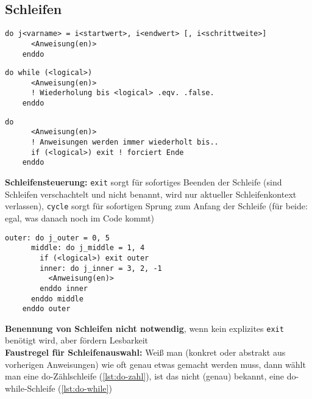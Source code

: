 \documentclass[a4paper, twocolumn]{scrarticle}
\begin{document}
  \subsection{Schleifen}
  \begin{lstlisting}[caption={\bfseries do-Zählschleife (Schrittweite standardmäßig 1, kann auch negativ sein)}, label=lst:do-zahl]
    do j<varname> = i<startwert>, i<endwert> [, i<schrittweite>]
      <Anweisung(en)>
    enddo
  \end{lstlisting}
  \begin{lstlisting}[caption={\bfseries do-while-Schleife}, label=lst:do-while]
    do while (<logical>)
      <Anweisung(en)>
      ! Wiederholung bis <logical> .eqv. .false.
    enddo
  \end{lstlisting}
  \begin{lstlisting}[caption={\bfseries do-Schleife (CAVE!)}, label=lst:do]
    do
      <Anweisung(en)>
      ! Anweisungen werden immer wiederholt bis..
      if (<logical>) exit ! forciert Ende
    enddo
  \end{lstlisting}
 \textbf{Schleifensteuerung:} \lstinline|exit| sorgt für sofortiges Beenden der Schleife (sind Schleifen verschachtelt und nicht benannt, wird nur aktueller Schleifenkontext verlassen), \lstinline|cycle| sorgt für sofortigen Sprung zum Anfang der Schleife (für beide: egal, was danach noch im Code kommt)
  \begin{lstlisting}[caption={\bfseries Benannte do-Schleifen und explizites exit}]
    outer: do j_outer = 0, 5
      middle: do j_middle = 1, 4
        if (<logical>) exit outer
        inner: do j_inner = 3, 2, -1
          <Anweisung(en)>
        enddo inner
      enddo middle
    enddo outer
  \end{lstlisting}
 \textbf{ Benennung von Schleifen nicht notwendig}, wenn kein explizites \lstinline|exit| benötigt wird, aber fördern Lesbarkeit\\
  \textbf{Faustregel für Schleifenauswahl:} Weiß man (konkret oder abstrakt aus vorherigen Anweisungen) wie oft genau etwas gemacht werden muss, dann wählt man eine do-Zählschleife (\cref{lst:do-zahl}), ist das nicht (genau) bekannt, eine do-while-Schleife (\cref{lst:do-while})
  
\end{document}
